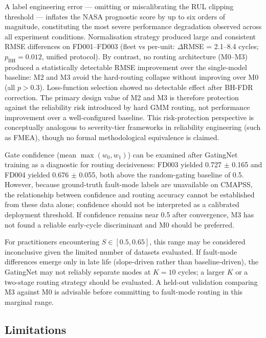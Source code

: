 \documentclass[preprint,10pt]{elsarticle}
\begin{document}
A label engineering error --- omitting or miscalibrating the RUL clipping threshold --- inflates the NASA prognostic score by up to six orders of magnitude, constituting the most severe performance degradation observed across all experiment conditions. Normalisation strategy produced large and consistent RMSE differences on FD001--FD003 (fleet vs per-unit: $\Delta$RMSE = 2.1--8.4 cycles; $p_\text{BH} = 0.012$, unified protocol). By contrast, no routing architecture (M0--M3) produced a statistically detectable RMSE improvement over the single-model baseline: M2 and M3 avoid the hard-routing collapse without improving over M0 (all $p > 0.3$). Loss-function selection showed no detectable effect after BH-FDR correction. The primary design value of M2 and M3 is therefore protection against the reliability risk introduced by hard GMM routing, not performance improvement over a well-configured baseline. This risk-protection perspective is conceptually analogous to severity-tier frameworks in reliability engineering (such as FMEA), though no formal methodological equivalence is claimed.

Gate confidence (mean $\max(w_0, w_1)$) can be examined after GatingNet training as a diagnostic for routing decisiveness: FD003 yielded 0.727 $\pm$ 0.165 and FD004 yielded 0.676 $\pm$ 0.055, both above the random-gating baseline of 0.5. However, because ground-truth fault-mode labels are unavailable on CMAPSS, the relationship between confidence and routing accuracy cannot be established from these data alone; confidence should not be interpreted as a calibrated deployment threshold. If confidence remains near 0.5 after convergence, M3 has not found a reliable early-cycle discriminant and M0 should be preferred.

For practitioners encountering $S \in [0.5, 0.65]$, this range may be considered inconclusive given the limited number of datasets evaluated. If fault-mode differences emerge only in late life (slope-driven rather than baseline-driven), the GatingNet may not reliably separate modes at $K = 10$ cycles; a larger $K$ or a two-stage routing strategy should be evaluated. A held-out validation comparing M3 against M0 is advisable before committing to fault-mode routing in this marginal range.

\subsection{Limitations}
\end{document}
